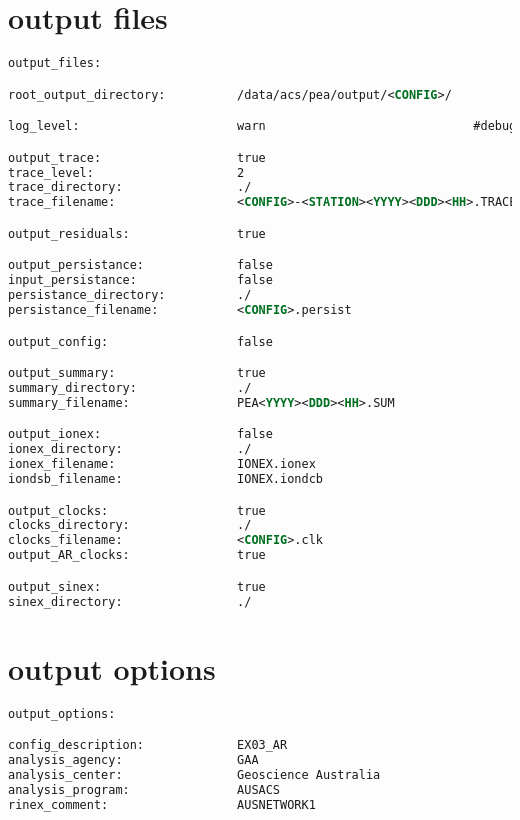 \section{output files}
\begin{lstlisting}[language=xml,caption=yaml input files configuration example]
output_files:

root_output_directory:          /data/acs/pea/output/<CONFIG>/

log_level:                      warn                             #debug, info, warn, error as defined in boost::log

output_trace:                   true
trace_level:                    2
trace_directory:                ./
trace_filename:                 <CONFIG>-<STATION><YYYY><DDD><HH>.TRACE

output_residuals:               true

output_persistance:             false
input_persistance:              false
persistance_directory:          ./
persistance_filename:           <CONFIG>.persist

output_config:                  false

output_summary:                 true
summary_directory:              ./
summary_filename:               PEA<YYYY><DDD><HH>.SUM

output_ionex:                   false
ionex_directory:                ./
ionex_filename:                 IONEX.ionex
iondsb_filename:                IONEX.iondcb

output_clocks:                  true
clocks_directory:               ./
clocks_filename:                <CONFIG>.clk
output_AR_clocks:               true

output_sinex:                   true
sinex_directory:                ./
\end{lstlisting}

\section{output options}

\begin{lstlisting}[language=xml,caption=yaml input files configuration example]
output_options:

config_description:             EX03_AR
analysis_agency:                GAA
analysis_center:                Geoscience Australia
analysis_program:               AUSACS
rinex_comment:                  AUSNETWORK1
\end{lstlisting}

